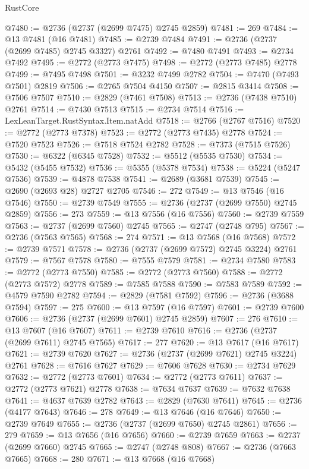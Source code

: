 \begin{lexlean}{RustCore}
\begin{coremodule}
@7480 := @2736 (@2737 (@2699 @7475) @2745 @2859)
@7481 := 269
@7484 := @13 @7481 (@16 @7481)
@7485 := @2739 @7484
@7491 := @2736 (@2737 (@2699 @7485) @2745 @3327) @2761
@7492 := @7480 @7491
@7493 := @2734 @7492
@7495 := @2772 (@2773 @7475)
@7498 := @2772 (@2773 @7485) @2778
@7499 := @7495 @7498
@7501 := @3232 @7499 @2782
@7504 := @7470 (@7493 @7501) @2819
@7506 := @2765 @7504 @4150
@7507 := @2815 @3414
@7508 := @7506 @7507
@7510 := @2829 (@7461 @7508)
@7513 := @2736 (@7438 @7510) @2761
@7514 := @7430 @7513
@7515 := @2734 @7514
@7516 := LexLeanTarget.RustSyntax.Item.natAdd
@7518 := @2766 (@2767 @7516)
@7520 := @2772 (@2773 @7378)
@7523 := @2772 (@2773 @7435) @2778
@7524 := @7520 @7523
@7526 := @7518 @7524 @2782
@7528 := @7373 (@7515 @7526)
@7530 := @6322 (@6345 @7528)
@7532 := @5512 (@5535 @7530)
@7534 := @5432 (@5455 @7532)
@7536 := @5355 (@5378 @7534)
@7538 := @5224 (@5247 @7536)
@7539 := @4878 @7538
@7541 := @2689 (@3681 @7539)
@7545 := @2690 (@2693 @28) @2727 @2705
@7546 := 272
@7549 := @13 @7546 (@16 @7546)
@7550 := @2739 @7549
@7555 := @2736 (@2737 (@2699 @7550) @2745 @2859)
@7556 := 273
@7559 := @13 @7556 (@16 @7556)
@7560 := @2739 @7559
@7563 := @2737 (@2699 @7560) @2745
@7565 := @2747 (@2748 @795)
@7567 := @2736 (@7563 @7565)
@7568 := 274
@7571 := @13 @7568 (@16 @7568)
@7572 := @2739 @7571
@7578 := @2736 (@2737 (@2699 @7572) @2745 @3224) @2761
@7579 := @7567 @7578
@7580 := @7555 @7579
@7581 := @2734 @7580
@7583 := @2772 (@2773 @7550)
@7585 := @2772 (@2773 @7560)
@7588 := @2772 (@2773 @7572) @2778
@7589 := @7585 @7588
@7590 := @7583 @7589
@7592 := @4579 @7590 @2782
@7594 := @2829 (@7581 @7592)
@7596 := @2736 (@3688 @7594)
@7597 := 275
@7600 := @13 @7597 (@16 @7597)
@7601 := @2739 @7600
@7606 := @2736 (@2737 (@2699 @7601) @2745 @2859)
@7607 := 276
@7610 := @13 @7607 (@16 @7607)
@7611 := @2739 @7610
@7616 := @2736 (@2737 (@2699 @7611) @2745 @7565)
@7617 := 277
@7620 := @13 @7617 (@16 @7617)
@7621 := @2739 @7620
@7627 := @2736 (@2737 (@2699 @7621) @2745 @3224) @2761
@7628 := @7616 @7627
@7629 := @7606 @7628
@7630 := @2734 @7629
@7632 := @2772 (@2773 @7601)
@7634 := @2772 (@2773 @7611)
@7637 := @2772 (@2773 @7621) @2778
@7638 := @7634 @7637
@7639 := @7632 @7638
@7641 := @4637 @7639 @2782
@7643 := @2829 (@7630 @7641)
@7645 := @2736 (@4177 @7643)
@7646 := 278
@7649 := @13 @7646 (@16 @7646)
@7650 := @2739 @7649
@7655 := @2736 (@2737 (@2699 @7650) @2745 @2861)
@7656 := 279
@7659 := @13 @7656 (@16 @7656)
@7660 := @2739 @7659
@7663 := @2737 (@2699 @7660) @2745
@7665 := @2747 (@2748 @808)
@7667 := @2736 (@7663 @7665)
@7668 := 280
@7671 := @13 @7668 (@16 @7668)

\end{coremodule}
\end{lexlean}
